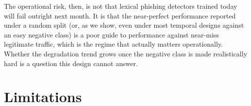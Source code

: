 \documentclass[10pt, a4paper, oneside]{article}
\begin{document}
\begin{table}[h]
\centering
\caption{F1 (fixed-training design, averaged across displaced blocks 2--6) with all 32 features, without the four features tied to legitimate-URL construction (\texttt{is\_https}, \texttt{path\_length}, \texttt{num\_slashes}, \texttt{url\_length}), and without four other important features as a control (\texttt{url\_entropy}, \texttt{num\_dots}, \texttt{num\_subdomains}, \texttt{hostname\_length}). Scaling is fitted on the training block.}
\label{tab:ablation}
\end{table}

The operational risk, then, is not that lexical phishing detectors trained today will fail outright next month. It is that the near-perfect performance reported under a random split (or, as we show, even under most temporal designs against an easy negative class) is a poor guide to performance against near-miss legitimate traffic, which is the regime that actually matters operationally. Whether the degradation trend grows once the negative class is made realistically hard is a question this design cannot answer.

\section{Limitations}
\end{document}

